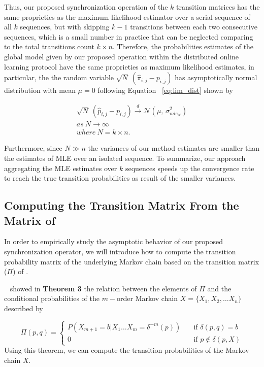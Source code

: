 \par Thus, our proposed synchronization operation of the $k$ transition matrices has the same proprieties as the maximum likelihood estimator over a serial sequence of all $k$ sequences, but with skipping $k-1$ transitions between each two consecutive sequences, which is a small number in practice that can be neglected comparing to the total transitions count $k \times n$. Therefore, the probabilities estimates of the global model given by our proposed operation within the distributed online learning protocol have the same proprieties as maximum likelihood estimates, in particular, the the random variable $\sqrt{N}\ (\hat{\pi}_{i,j} - {p}_{i,j})$ has asymptotically normal distribution with mean $\mu=0$ following Equation ~\ref{eq:lim_dist} shown by 

\begin{equation}
\begin{aligned}
\label{eq:lim_dist2}
\sqrt{N}\ (\hat{p}_{i,j} - {p}_{i,j}) \xrightarrow{d} \mathcal{N}(\mu,\,\sigma^{2}_{mle_N})\\
as\ N \xrightarrow{} \infty\\
where\ N = k \times n.
\end{aligned}
\end{equation}



Furthermore, since $N \gg n$ the variances of our method estimates are smaller than the estimates of MLE over an isolated sequence. To summarize, our approach aggregating the MLE estimates over $k$ sequences speeds up the convergence rate to reach the true transition probabilities as result of the  smaller variances.
 
\subsection{Computing the Transition Matrix From the Matrix of \pmcmr }

\par In order to empirically study the asymptotic behavior of our proposed synchronization operator, we will introduce how to compute the transition probability matrix of the underlying Markov chain based on the transition matrix ($\Pi$) of \pmcmr.

~\citet{nuel_pattern_2008} showed in \textbf{Theorem 3} the relation between the elements  of 
$\Pi$ and the conditional probabilities of the $m-$order Markov chain $X=\{X_1, X_2, \ldots X_n\}$ described by 

\[ \Pi(p, q) =
\begin{cases}
P(X_{m+1}=b|X_1\ldots X_m=\delta^{-m}(p))       & \quad \text{if } \delta(p,q)=b \\
0  & \quad \text{if } p \notin  \delta(p,X)
\end{cases}
\]
Using this theorem, we can compute the transition probabilities of the Markov chain $X$.
